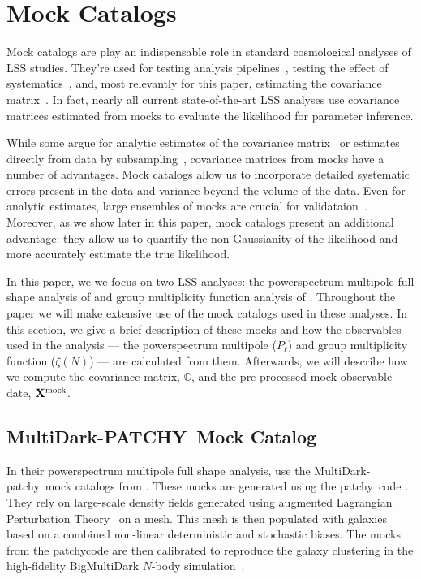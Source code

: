 \documentclass[12pt, letterpaper, preprint]{aastex}
\newcommand{\patchy}{{\fontshape\scdefault\selectfont patchy}}
\begin{document}
\section{Mock Catalogs}
Mock catalogs are play an indispensable role in standard cosmological 
anslyses of LSS studies. They're used for testing analysis 
pipelines~\citep[][]{beutler2017, grieb2017, tinkerinpreparation}, 
testing the effect of systematics~\citep{guo2012, vargas-magana2014, hahn2017, pinol2017, ross2017}, 
and, most relevantly for this paper, estimating the covariance 
matrix~\citep[][]{parkinson2012, kazin2014, grieb2017, alam2017, beutler2017, sinha2017a}. 
In fact, nearly all current state-of-the-art LSS analyses use
covariance matrices estimated from mocks to evaluate the likelihood 
for parameter inference. 

While some argue for analytic estimates of the covariance 
matrix~\citep[e.g.][]{mohammed2017} or estimates directly from data
by subsampling~\citep[e.g.][]{norberg2009}, covariance matrices 
from mocks have a number of advantages. Mock catalogs allow us 
to incorporate detailed systematic errors present in the 
data and variance beyond the volume of the data. Even for analytic 
estimates, large ensembles of mocks are crucial for validataion~\citep{slepian2017}. 
Moreover, as we show later in this paper, mock catalogs present an
additional advantage: they allow us to 
quantify the non-Gaussianity of the likelihood and more accurately 
estimate the true likelihood. 

In this paper, we we focus on two LSS analyses: the powerspectrum 
multipole full shape analysis of \cite{beutler2017} and group multiplicity 
function analysis of \cite{sinha2017a}. Throughout the paper we will 
make extensive use of the mock catalogs used in these analyses. 
In this section, we give a brief description of these mocks and how 
the observables used in the analysis --- the powerspectrum 
multipole ($P_\ell$) and group multiplicity function ($\zeta(N)$) ---
are calculated from them. Afterwards, we will describe how we compute 
the covariance matrix, $\mathbb{C}$, and the pre-processed mock observable
date, ${\bf X}^\mathrm{mock}$.

\subsection{MultiDark-PATCHY~Mock Catalog} \label{sec:patchy}
In their powerspectrum multipole full shape analysis, \cite{beutler2017}
use the MultiDark-\patchy~mock catalogs from \cite{kitaura2016}. 
These mocks are generated using the \patchy~code \citep{kitaura2014,kitaura2015}. 
They rely on large-scale density fields generated using augmented
Lagrangian Perturbation Theory~\citep[ALPT;][]{kitaura2013} on a mesh.
This mesh is then populated with galaxies based on a combined non-linear
deterministic and stochastic biases. The mocks from the \patchy code 
are then calibrated to reproduce the galaxy clustering in the 
high-fidelity BigMultiDark $N$-body simulation~\citep{rodriguez-torres2016, klypin2016}. 
\end{document}
